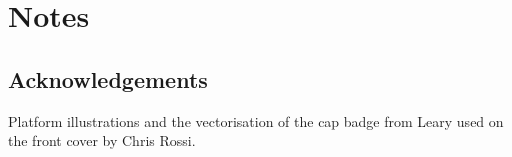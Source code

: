 \part{Notes}

\chapter*{Acknowledgements}

Platform illustrations and the vectorisation of the cap badge from Leary used on the front cover by Chris Rossi.
